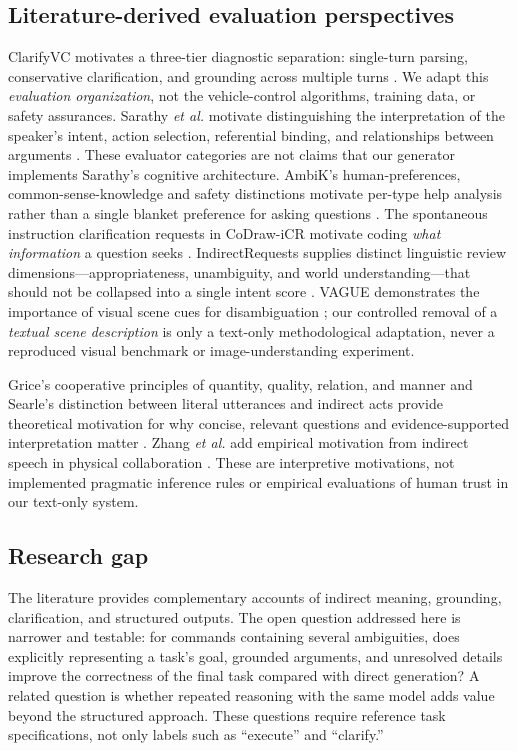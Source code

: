 \documentclass[10pt,conference]{IEEEtran}
\begin{document}
\subsection{Literature-derived evaluation perspectives}
ClarifyVC motivates a three-tier diagnostic separation: single-turn parsing, conservative clarification, and grounding across multiple turns \cite{clarifyvc}. We adapt this \emph{evaluation organization}, not the vehicle-control algorithms, training data, or safety assurances. Sarathy \emph{et al.} motivate distinguishing the interpretation of the speaker's intent, action selection, referential binding, and relationships between arguments \cite{sarathy}. These evaluator categories are not claims that our generator implements Sarathy's cognitive architecture. AmbiK's human-preferences, common-sense-knowledge and safety distinctions motivate per-type help analysis rather than a single blanket preference for asking questions \cite{ambik}. The spontaneous instruction clarification requests in CoDraw-iCR motivate coding \emph{what information} a question seeks \cite{codraw}. IndirectRequests supplies distinct linguistic review dimensions---appropriateness, unambiguity, and world understanding---that should not be collapsed into a single intent score \cite{mannekote}. VAGUE demonstrates the importance of visual scene cues for disambiguation \cite{vague}; our controlled removal of a \emph{textual scene description} is only a text-only methodological adaptation, never a reproduced visual benchmark or image-understanding experiment.

Grice's cooperative principles of quantity, quality, relation, and manner and Searle's distinction between literal utterances and indirect acts provide theoretical motivation for why concise, relevant questions and evidence-supported interpretation matter \cite{grice1975,searle1975}. Zhang \emph{et al.} add empirical motivation from indirect speech in physical collaboration \cite{tool}. These are interpretive motivations, not implemented pragmatic inference rules or empirical evaluations of human trust in our text-only system.

\subsection{Research gap}
The literature provides complementary accounts of indirect meaning, grounding, clarification, and structured outputs. The open question addressed here is narrower and testable: for commands containing several ambiguities, does explicitly representing a task's goal, grounded arguments, and unresolved details improve the correctness of the final task compared with direct generation? A related question is whether repeated reasoning with the same model adds value beyond the structured approach. These questions require reference task specifications, not only labels such as ``execute'' and ``clarify.''
\end{document}
